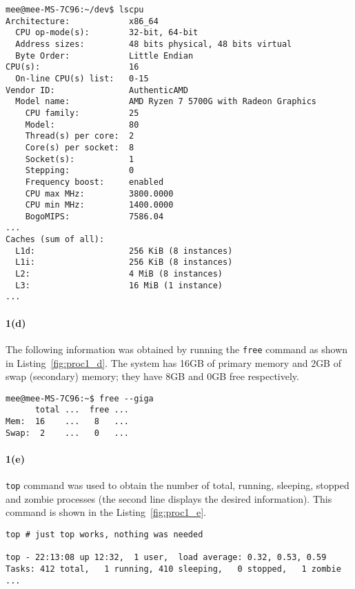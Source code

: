 \documentclass[final,5p,times,authoryear]{elsarticle}
\begin{document}
\begin{lstlisting}[captionpos=b, caption={Snippet showing the various CPU related statistics for Ryzen 7 based system.},label={fig:proc1_a_b_c},style=codeBash]
mee@mee-MS-7C96:~/dev$ lscpu
Architecture:            x86_64
  CPU op-mode(s):        32-bit, 64-bit
  Address sizes:         48 bits physical, 48 bits virtual
  Byte Order:            Little Endian
CPU(s):                  16
  On-line CPU(s) list:   0-15
Vendor ID:               AuthenticAMD
  Model name:            AMD Ryzen 7 5700G with Radeon Graphics
    CPU family:          25
    Model:               80
    Thread(s) per core:  2
    Core(s) per socket:  8
    Socket(s):           1
    Stepping:            0
    Frequency boost:     enabled
    CPU max MHz:         3800.0000
    CPU min MHz:         1400.0000
    BogoMIPS:            7586.04
...
Caches (sum of all):     
  L1d:                   256 KiB (8 instances)
  L1i:                   256 KiB (8 instances)
  L2:                    4 MiB (8 instances)
  L3:                    16 MiB (1 instance)
...  
\end{lstlisting}

\paragraph{\bf 1(d)}
The following information was obtained by running the {\tt free} command as shown in Listing~\ref{fig:proc1_d}. The system has 16GB of primary memory and 2GB of swap (secondary) memory; they have 8GB and 0GB free respectively. 

\begin{lstlisting}[captionpos=b, caption={Snippet showing memory usage status.},label={fig:proc1_d},style=codeBash]
mee@mee-MS-7C96:~$ free --giga
      total ...  free ...
Mem:  16    ...   8   ...
Swap:  2    ...   0   ...
\end{lstlisting}


\paragraph{\bf 1(e)}
{\tt top} command was used to obtain the number of total, running, sleeping, stopped and zombie processes (the second line displays the desired information). This command is shown in the Listing~\ref{fig:proc1_e}. 
\begin{lstlisting}[captionpos=b, caption={Snippet showing usage of {\tt top} command to check the number of total, running, sleeping, stopped and zombie processes.},label={fig:proc1_e},style=codeBash]
top # just top works, nothing was needed

top - 22:13:08 up 12:32,  1 user,  load average: 0.32, 0.53, 0.59
Tasks: 412 total,   1 running, 410 sleeping,   0 stopped,   1 zombie
...
\end{lstlisting}
\end{document}
